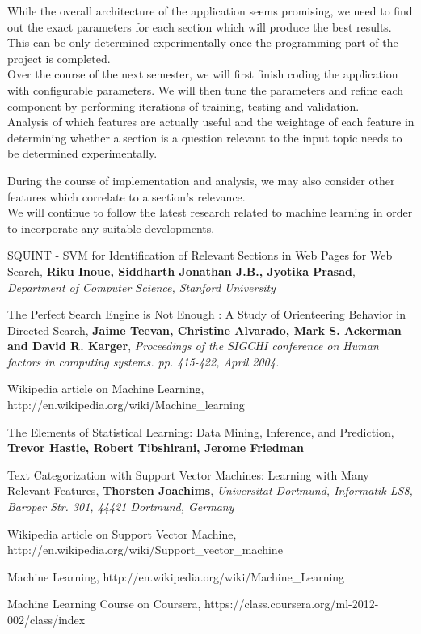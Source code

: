 \documentclass[10pt,a4paper]{report}
\begin{document}
While the overall architecture of the application seems promising, we need to find out the exact parameters for each section which will produce the best results. This can be only determined experimentally once the programming part of the project is completed. \\

Over the course of the next semester, we will first finish coding the application with configurable parameters. We will then tune the parameters and refine each component by performing iterations of training, testing and validation. \\

Analysis of which features are actually useful and the weightage of each feature in determining whether a section is a question relevant to the input topic needs to be determined experimentally. 

During the course of implementation and analysis, we may also consider other features which correlate to a section's relevance. \\

We will continue to follow the latest research related to machine learning in order to incorporate any suitable developments. \\


\clearpage
{}
\begin{thebibliography}{99}

 SQUINT - SVM for Identification of Relevant Sections in Web Pages for Web Search, \textbf{Riku Inoue, Siddharth Jonathan J.B., Jyotika Prasad}, \textit{Department of Computer Science, Stanford University}

 The Perfect Search Engine is Not Enough : A Study of Orienteering Behavior in Directed Search, \textbf{Jaime Teevan, Christine Alvarado, Mark S. Ackerman and David R. Karger}, \textit{Proceedings of the SIGCHI conference on Human factors in computing systems. pp. 415-422, April 2004.}

 Wikipedia article on Machine Learning, http://en.wikipedia.org/wiki/Machine\_learning

 The Elements of Statistical Learning: Data Mining, Inference, and Prediction, \textbf{Trevor Hastie, Robert Tibshirani, Jerome Friedman}

 Text Categorization with Support Vector Machines: Learning with Many Relevant Features, \textbf{Thorsten Joachims}, \textit{Universitat Dortmund, Informatik LS8, Baroper Str. 301, 44421 Dortmund, Germany}

 Wikipedia article on Support Vector Machine, http://en.wikipedia.org/wiki/Support\_vector\_machine

 Machine Learning, http://en.wikipedia.org/wiki/Machine\_Learning

 Machine Learning Course on Coursera, https://class.coursera.org/ml-2012-002/class/index

\end{thebibliography}

\end{document}

